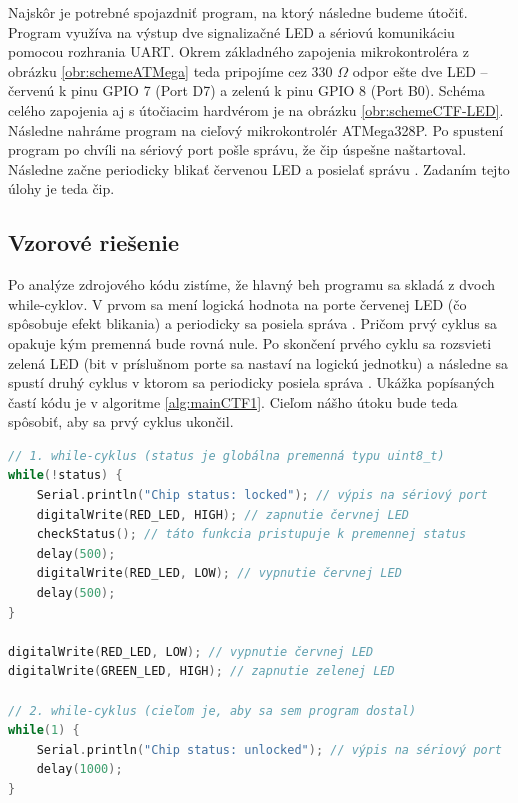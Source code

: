 Najskôr je potrebné spojazdniť program, na ktorý následne budeme útočiť. Program využíva na výstup dve signalizačné LED a sériovú komunikáciu pomocou rozhrania UART. Okrem základného zapojenia mikrokontroléra z obrázku \ref{obr:schemeATMega} teda pripojíme cez 330 $\Omega$ odpor ešte dve LED -- červenú k pinu GPIO 7 (Port D7) a zelenú k pinu GPIO 8 (Port B0). Schéma celého zapojenia aj s útočiacim hardvérom je na obrázku \ref{obr:schemeCTF-LED}. Následne nahráme program na cieľový mikrokontrolér ATMega328P. Po spustení program po chvíli na sériový port pošle správu, že čip úspešne naštartoval. Následne začne periodicky blikať červenou LED a posielať správu . Zadaním tejto úlohy je teda  čip.

\subsection{Vzorové riešenie}
Po analýze zdrojového kódu zistíme, že hlavný beh programu sa skladá z dvoch while-cyklov. V prvom sa mení logická hodnota na porte červenej LED (čo spôsobuje efekt blikania) a periodicky sa posiela správa . Pričom prvý cyklus sa opakuje kým premenná  bude rovná nule. Po skončení prvého cyklu sa rozsvieti zelená LED (bit v príslušnom porte sa nastaví na logickú jednotku) a následne sa spustí druhý cyklus v ktorom sa periodicky posiela správa . Ukážka  popísaných častí kódu je v algoritme \ref{alg:mainCTF1}. Cieľom nášho útoku bude teda spôsobiť, aby sa prvý cyklus ukončil.

\begin{lstlisting}[float,language=C,caption={Ukážka kóu hlavnej časti programu z príkladu 1.},label=alg:mainCTF1]
// 1. while-cyklus (status je globálna premenná typu uint8_t)
while(!status) {
    Serial.println("Chip status: locked"); // výpis na sériový port
    digitalWrite(RED_LED, HIGH); // zapnutie červnej LED
    checkStatus(); // táto funkcia pristupuje k premennej status
    delay(500);
    digitalWrite(RED_LED, LOW); // vypnutie červnej LED
    delay(500);
}

digitalWrite(RED_LED, LOW); // vypnutie červnej LED
digitalWrite(GREEN_LED, HIGH); // zapnutie zelenej LED

// 2. while-cyklus (cieľom je, aby sa sem program dostal)
while(1) {
    Serial.println("Chip status: unlocked"); // výpis na sériový port
    delay(1000);
}
\end{lstlisting}

